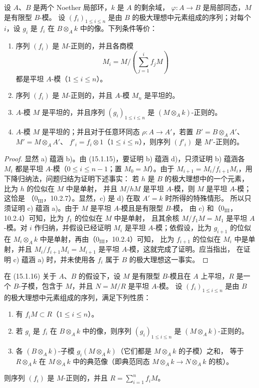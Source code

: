 \begin{proposition}[15.1.16]
\label{0.15.1.16-fr}
设 $A$、$B$ 是两个 Noether 局部环，$k$ 是 $A$ 的剩余域，
$\varphi:A\to B$ 是局部同态，$M$ 是有限型 $B$-模。
设 $(f_i)_{1\leq i\leq n}$ 是由 $B$ 的极大理想中元素组成的序列；对每个
$i$，设 $g_i$ 是 $f_i$ 在 $B\otimes_A k$ 中的像。下列条件等价：
\begin{enumerate}
  \item[\rm(a)] 序列 $(f_i)$ 是 $M$-正则的，并且各商模
  \[
    M_i=M/\left(\sum_{j=1}^i f_jM\right)
  \]
  都是平坦 $A$-模（$1\leq i\leq n$）。
  \item[\rm(b)] 序列 $(f_i)$ 是 $M$-正则的，并且 $A$-模 $M_n$ 是平坦的。
  \item[\rm(c)] $A$-模 $M$ 是平坦的，并且序列
  $(g_i)_{1\leq i\leq n}$ 是 $(M\otimes_A k)$-正则的。
  \item[\rm(d)] $A$-模 $M$ 是平坦的；并且对于任意环同态
  $\rho:A\to A'$，若置 $B'=B\otimes_A A'$、$M'=M\otimes_A A'$、
  $f'_i=f_i\otimes1$（$1\leq i\leq n$），则序列 $(f'_i)$ 是
  $M'$-正则的。
\end{enumerate}
\end{proposition}

\begin{proof}
显然 a) 蕴涵 b)。由 (15.1.15)，要证明 b) 蕴涵 d)，只须证明 b) 蕴涵各
$M_i$ 都是平坦 $A$-模（$0\leq i\leq n-1$；置 $M_0=M$）。由于
$M_{i+1}=M_i/f_{i+1}M_i$，用下降归纳法，问题归结为证明下述事实：
若 $h$ 是 $B$ 的极大理想中的一个元素，比为 $h$ 的位似在 $M$ 中是单射，
并且 $M/hM$ 是平坦 $A$-模，则 $M$ 是平坦 $A$-模；这恰是
（$0_{\mathrm{III}}$，10.2.7）。显然，c) 是 d) 在取 $A'=k$ 时所得的特殊情形。
所以只须证明 c) 蕴涵 a)。由于 $M$ 是平坦 $A$-模且是有限型 $B$-模，
由 c) 和（$0_{\mathrm{III}}$，10.2.4）可知，比为 $f_1$ 的位似在 $M$ 中是单射，
且其余核 $M/f_1M=M_1$ 是平坦 $A$-模。对 $i$ 作归纳，并假设已经证明
$M_i$ 是平坦 $A$-模；依假设，比为 $g_{i+1}$ 的位似在
$M_i\otimes_A k$ 中是单射，再由（$0_{\mathrm{III}}$，10.2.4）可知，
比为 $f_{i+1}$ 的位似在 $M_i$ 中是单射，并且
$M_i/f_{i+1}M_i=M_{i+1}$ 是平坦 $A$-模，这就完成了证明。应当指出，
在证明 c) 蕴涵 a) 时，并未使用各 $f_i$ 属于 $B$ 的极大理想这一事实。
\end{proof}

\begin{corollary}[15.1.17]
\label{0.15.1.17-fr}
在 (15.1.16) 关于 $A$、$B$ 的假设下，设 $M$ 是有限型 $B$-模且在 $A$
上平坦，$R$ 是一个 $B$-子模，包含于 $M$，并且 $N=M/R$ 是平坦 $A$-模。
设 $(f_i)_{1\leq i\leq n}$ 是由 $B$ 的极大理想中元素组成的序列，满足下列性质：
\begin{enumerate}
  \item[(i)] 有 $f_iM\subset R$（$1\leq i\leq n$）。
  \item[(ii)] 若 $g_i$ 是 $f_i$ 在 $B\otimes_A k$ 中的像，则序列
  $(g_i)_{1\leq i\leq n}$ 是 $(M\otimes_A k)$-正则的。
  \item[(iii)] 各 $(B\otimes_A k)$-子模
  $g_i(M\otimes_A k)$（它们都是 $M\otimes_A k$ 的子模）之和，
  等于 $R\otimes_A k$ 在 $M\otimes_A k$
  中的典范像（即典范同态 $M\otimes_A k\to N\otimes_A k$ 的核）。
\end{enumerate}
则序列 $(f_i)$ 是 $M$-正则的，并且
$R=\sum_{i=1}^n f_iM$。
\end{corollary}

